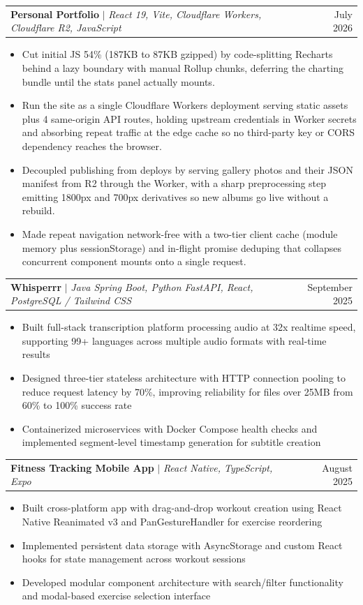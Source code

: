 \documentclass[letterpaper,11pt]{article}
\makeatletter
\newcommand{\resumeItem}[1]{
  \item\small{
    {#1 \vspace{-2pt}}
  }
}
\newcommand{\resumeProjectHeading}[2]{
    \item
    \begin{tabular*}{0.97\textwidth}{l@{\extracolsep{\fill}}r}
      \small#1 & #2 \\
    \end{tabular*}\vspace{-7pt}
}
\newcommand{\resumeItemListStart}{\begin{itemize}}
\newcommand{\resumeItemListEnd}{\end{itemize}\vspace{-5pt}}
\makeatother
\begin{document}
    \resumeProjectHeading
      {\textbf{Personal Portfolio} $|$ \emph{React 19, Vite, Cloudflare Workers, Cloudflare R2, JavaScript}}{July 2026}
      \resumeItemListStart
        \resumeItem{Cut initial JS 54\% (187KB to 87KB gzipped) by code-splitting Recharts behind a lazy boundary with manual Rollup chunks, deferring the charting bundle until the stats panel actually mounts.}
        \resumeItem{Run the site as a single Cloudflare Workers deployment serving static assets plus 4 same-origin API routes, holding upstream credentials in Worker secrets and absorbing repeat traffic at the edge cache so no third-party key or CORS dependency reaches the browser.}
        \resumeItem{Decoupled publishing from deploys by serving gallery photos and their JSON manifest from R2 through the Worker, with a sharp preprocessing step emitting 1800px and 700px derivatives so new albums go live without a rebuild.}
        \resumeItem{Made repeat navigation network-free with a two-tier client cache (module memory plus sessionStorage) and in-flight promise deduping that collapses concurrent component mounts onto a single request.}
      \resumeItemListEnd

    \resumeProjectHeading
      {\textbf{Whisperrr} $|$ \emph{Java Spring Boot, Python FastAPI, React, PostgreSQL / Tailwind CSS}}{September 2025}
      \resumeItemListStart
        \resumeItem{Built full-stack transcription platform processing audio at 32x realtime speed, supporting 99+ languages across multiple audio formats with real-time results}
        \resumeItem{Designed three-tier stateless architecture with HTTP connection pooling to reduce request latency by 70\%, improving reliability for files over 25MB from 60\% to 100\% success rate}
        \resumeItem{Containerized microservices with Docker Compose health checks and implemented segment-level timestamp generation for subtitle creation}
      \resumeItemListEnd

    \resumeProjectHeading
      {\textbf{Fitness Tracking Mobile App} $|$ \emph{React Native, TypeScript, Expo}}{August 2025}
      \resumeItemListStart
        \resumeItem{Built cross-platform app with drag-and-drop workout creation using React Native Reanimated v3 and PanGestureHandler for exercise reordering}
        \resumeItem{Implemented persistent data storage with AsyncStorage and custom React hooks for state management across workout sessions}
        \resumeItem{Developed modular component architecture with search/filter functionality and modal-based exercise selection interface}
      \resumeItemListEnd
\end{document}
